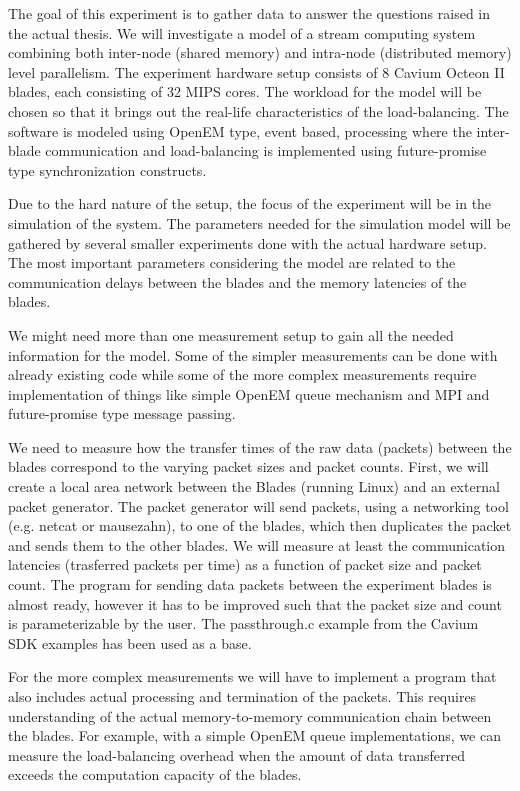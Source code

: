 The goal of this experiment is to gather data to answer the questions raised in the actual thesis. We will investigate a model of a stream computing system combining both inter-node (shared memory) and intra-node (distributed memory) level parallelism. The experiment hardware setup consists of 8 Cavium Octeon II blades, each consisting of 32 MIPS cores. The workload for the model will be chosen so that it brings out the real-life characteristics of the load-balancing. The software is modeled using OpenEM type, event based, processing where the inter-blade communication and load-balancing is implemented using future-promise type synchronization constructs.

Due to the hard nature of the setup, the focus of the experiment will be in the simulation of the system. The parameters needed for the simulation model will be gathered by several smaller experiments done with the actual hardware setup. The most important parameters considering the model are related to the communication delays between the blades and the memory latencies of the blades.

We might need more than one measurement setup to gain all the needed information for the model. Some of the simpler measurements can be done with already existing code while some of the more complex measurements require implementation of things like simple OpenEM queue mechanism and MPI and future-promise type message passing.

We need to measure how the transfer times of the raw data (packets) between the blades correspond to the varying packet sizes and packet counts. First, we will create a local area network between the Blades (running Linux) and an external packet generator. The packet generator will send packets, using a networking tool (e.g. netcat or mausezahn), to one of the blades, which then duplicates the packet and sends them to the other blades. We will measure at least the communication latencies (trasferred packets per time) as a function of packet size and packet count. The program for sending data packets between the experiment blades is almost ready, however it has to be improved such that the packet size and count is parameterizable by the user. The passthrough.c example from the Cavium SDK examples has been used as a base.

For the more complex measurements we will have to implement a program that also includes actual processing and termination of the packets. This requires understanding of the actual memory-to-memory communication chain between the blades. For example, with a simple OpenEM queue implementations, we can measure the load-balancing overhead when the amount of data transferred exceeds the computation capacity of the blades.

